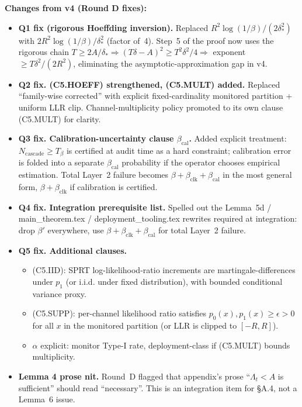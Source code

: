 \documentclass{article}
\newcommand{\deltastar}{\delta_{*}}
\newcommand{\Tbeta}{T_{\beta}}
\newcommand{\Ncasc}{N_{\mathrm{cascade}}}
\newcommand{\bclk}{\beta_{\mathrm{clk}}}
\newcommand{\bcal}{\beta_{\mathrm{cal}}}
\begin{document}
\textbf{Changes from v4 (Round D fixes):}

\begin{itemize}
\item \textbf{Q1 fix (rigorous Hoeffding inversion).}  Replaced
  $R^2\log(1/\beta)/(2\deltastar^2)$ with
  $2R^2\log(1/\beta)/\deltastar^2$ (factor of~4).  Step~5 of the
  proof now uses the rigorous chain $T \geq 2A/\deltastar
  \Rightarrow (T\delta - A)^2 \geq T^2\delta^2/4
  \Rightarrow$ exponent $\geq T\delta^2/(2R^2)$, eliminating the
  asymptotic-approximation gap in v4.
\item \textbf{Q2 fix.  (C5.HOEFF) strengthened, (C5.MULT) added.}
  Replaced ``family-wise corrected'' with explicit fixed-cardinality
  monitored partition + uniform LLR clip.  Channel-multiplicity
  policy promoted to its own clause (C5.MULT) for clarity.
\item \textbf{Q3 fix.  Calibration-uncertainty clause $\bcal$.}
  Added explicit treatment: $\Ncasc \geq \Tbeta$ is certified at
  audit time as a hard constraint; calibration error is folded
  into a separate $\bcal$ probability if the operator chooses
  empirical estimation.  Total Layer~2 failure becomes
  $\beta + \bclk + \bcal$ in the most general form, $\beta + \bclk$
  if calibration is certified.
\item \textbf{Q4 fix.  Integration prerequisite list.}  Spelled out
  the Lemma~5d / main\_theorem.tex / deployment\_tooling.tex
  rewrites required at integration: drop $\beta'$ everywhere, use
  $\beta + \bclk + \bcal$ for total Layer~2 failure.
\item \textbf{Q5 fix.  Additional clauses.}
  \begin{itemize}
  \item (C5.IID): SPRT log-likelihood-ratio increments are
    martingale-differences under $p_1$ (or i.i.d. under fixed
    distribution), with bounded conditional variance proxy.
  \item (C5.SUPP): per-channel likelihood ratio satisfies
    $p_0(x), p_1(x) \geq \epsilon > 0$ for all $x$ in the
    monitored partition (or LLR is clipped to $[-R, R]$).
  \item $\alpha$ explicit: monitor Type-I rate, deployment-class
    if (C5.MULT) bounds multiplicity.
  \end{itemize}
\item \textbf{Lemma 4 prose nit.}  Round~D flagged that
  appendix's prose ``$\Lambda_t < A$ is sufficient'' should read
  ``necessary''.  This is an integration item for §A.4, not a
  Lemma~6 issue.
\end{itemize}
\end{document}
